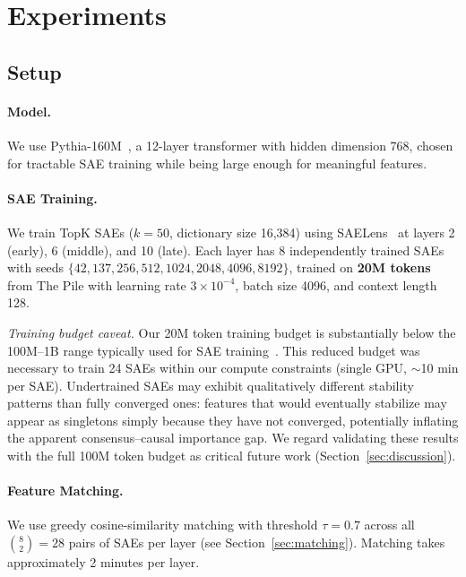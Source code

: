 \documentclass{article}
\begin{document}
\section{Experiments}
\label{sec:experiments}

\subsection{Setup}

\paragraph{Model.} We use Pythia-160M~\citep{biderman2023pythia}, a 12-layer transformer with hidden dimension 768, chosen for tractable SAE training while being large enough for meaningful features.

\paragraph{SAE Training.} We train TopK SAEs ($k = 50$, dictionary size 16{,}384) using SAELens~\citep{bloom2024saelens} at layers 2 (early), 6 (middle), and 10 (late). Each layer has 8 independently trained SAEs with seeds $\{42, 137, 256, 512, 1024, 2048, 4096, 8192\}$, trained on \textbf{20M tokens} from The Pile with learning rate $3 \times 10^{-4}$, batch size 4096, and context length 128.

\emph{Training budget caveat.} Our 20M token training budget is substantially below the 100M--1B range typically used for SAE training~\citep{gao2024scaling, paulo2025sparse}. This reduced budget was necessary to train 24 SAEs within our compute constraints (single GPU, $\sim$10 min per SAE). Undertrained SAEs may exhibit qualitatively different stability patterns than fully converged ones: features that would eventually stabilize may appear as singletons simply because they have not converged, potentially inflating the apparent consensus--causal importance gap. We regard validating these results with the full 100M token budget as critical future work (Section~\ref{sec:discussion}).

\paragraph{Feature Matching.} We use greedy cosine-similarity matching with threshold $\tau = 0.7$ across all $\binom{8}{2} = 28$ pairs of SAEs per layer (see Section~\ref{sec:matching}). Matching takes approximately 2 minutes per layer.
\end{document}
